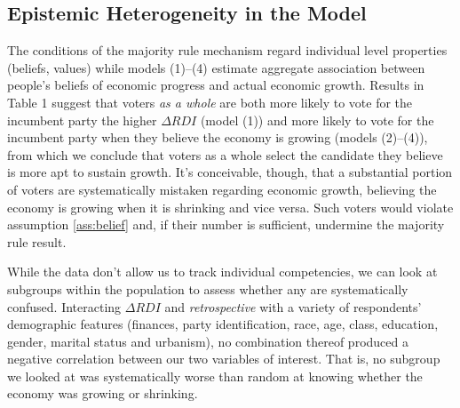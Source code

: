 \documentclass[11pt]{article}
\begin{document}
\subsection{Epistemic Heterogeneity in the Model}\label{sec:heterogeneity}
The conditions of the majority rule mechanism regard individual level
properties (beliefs, values) while  models (1)--(4) estimate
aggregate association between people's beliefs of economic progress
and actual economic growth. Results in Table 1 suggest that voters \emph{as a whole} are both more likely to vote
for the incumbent party the higher $\Delta RDI$ (model (1)) and more
likely to vote for the incumbent party when they believe the economy
is growing (models (2)--(4)), from which we conclude that voters as
a whole select the candidate they believe is more apt to sustain growth. It's conceivable, though, that a substantial portion of voters are
systematically mistaken regarding economic growth, believing the
economy is growing when it is shrinking and vice versa.
Such voters would violate assumption \ref{ass:belief} and, if their number
is sufficient, undermine the majority rule result.

While the data don't allow us to track individual competencies, we can look at subgroups within the population to assess whether any are systematically confused.
Interacting $\Delta RDI$ and \emph{retrospective} with a variety of respondents'  demographic features (finances, party identification, race, age, class, education, gender, marital status and urbanism), no combination thereof  produced a negative correlation between our two variables of interest. That is, no subgroup we looked at was systematically worse than random at knowing whether the economy was growing or shrinking.

\end{document}
